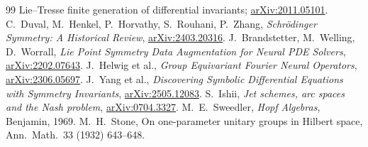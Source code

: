 \documentclass[11pt]{article}
\theoremstyle{definition}
\theoremstyle{remark}
\begin{document}
\begin{thebibliography}{99}
   Lie--Tresse finite generation of differential invariants; \href{https://arxiv.org/abs/2011.05101}{arXiv:2011.05101}.
   C.~Duval, M.~Henkel, P.~Horvathy, S.~Rouhani, P.~Zhang, \emph{Schr\"odinger Symmetry: A Historical Review}, \href{https://arxiv.org/abs/2403.20316}{arXiv:2403.20316}.
   J.~Brandstetter, M.~Welling, D.~Worrall, \emph{Lie Point Symmetry Data Augmentation for Neural PDE Solvers}, \href{https://arxiv.org/abs/2202.07643}{arXiv:2202.07643}.
   J.~Helwig et al., \emph{Group Equivariant Fourier Neural Operators}, \href{https://arxiv.org/abs/2306.05697}{arXiv:2306.05697}.
   J.~Yang et al., \emph{Discovering Symbolic Differential Equations with Symmetry Invariants}, \href{https://arxiv.org/abs/2505.12083}{arXiv:2505.12083}.
   S.~Ishii, \emph{Jet schemes, arc spaces and the Nash problem}, \href{https://arxiv.org/abs/0704.3327}{arXiv:0704.3327}.
   M.~E.~Sweedler, \emph{Hopf Algebras}, Benjamin, 1969.
   M.~H.~Stone, On one-parameter unitary groups in Hilbert space, Ann.\ Math.\ 33 (1932) 643--648.
\end{thebibliography}
\end{document}
